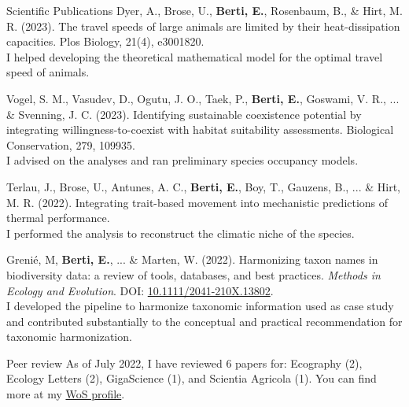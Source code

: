 \documentclass{resume} %
\begin{document}
\begin{rSection}{Scientific Publications}
Dyer, A., Brose, U., \textbf{Berti, E.}, Rosenbaum, B., \& Hirt, M. R. (2023). The travel speeds of large animals are limited by their heat-dissipation capacities. Plos Biology, 21(4), e3001820.\\
I helped developing the theoretical mathematical model for the optimal travel speed of animals.

Vogel, S. M., Vasudev, D., Ogutu, J. O., Taek, P., \textbf{Berti, E.}, Goswami, V. R., ... \& Svenning, J. C. (2023). Identifying sustainable coexistence potential by integrating willingness-to-coexist with habitat suitability assessments. Biological Conservation, 279, 109935.\\
I advised on the analyses and ran preliminary species occupancy models.

Terlau, J., Brose, U., Antunes, A. C., \textbf{Berti, E.}, Boy, T., Gauzens, B., ... \& Hirt, M. R. (2022). Integrating trait-based movement into mechanistic predictions of thermal performance.\\
I performed the analysis to reconstruct the climatic niche of the species.

Grenié, M, \textbf{Berti, E.}, ... \& Marten, W. (2022). Harmonizing taxon names in biodiversity data: a review of tools, databases, and best practices. \textit{Methods in Ecology and Evolution}. DOI: \href{https://doi.org/10.1111/2041-210X.13802}{10.1111/2041-210X.13802}.\\
I developed the pipeline to harmonize taxonomic information used as case study and contributed substantially to the conceptual and practical recommendation for taxonomic harmonization.
\end{rSection}

\begin{rSection}{Peer review}
As of July 2022, I have reviewed 6 papers for: Ecography (2), Ecology Letters (2), GigaScience (1), and Scientia Agricola (1). You can find more at my \href{https://www.webofscience.com/wos/author/record/2190178}{WoS profile}.
\end{rSection}
\end{document}
